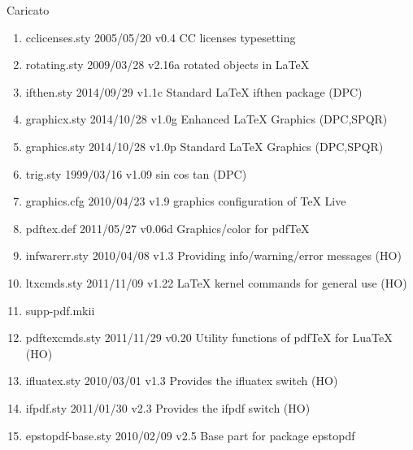 Caricato
\begin{enumerate}
\item 	cclicenses.sty    2005/05/20 v0.4 CC licenses typesetting
\item 	rotating.sty    2009/03/28 v2.16a rotated objects in LaTeX
\item  ifthen.sty    2014/09/29 v1.1c Standard LaTeX ifthen package (DPC)
	\item graphicx.sty 2014/10/28 v1.0g Enhanced LaTeX Graphics (DPC,SPQR)
	\item graphics.sty 2014/10/28 v1.0p Standard LaTeX Graphics (DPC,SPQR)
	\item trig.sty 1999/03/16 v1.09 sin cos tan (DPC)
	\item graphics.cfg 2010/04/23 v1.9 graphics configuration of TeX Live
	\item pdftex.def 2011/05/27 v0.06d Graphics/color for pdfTeX
	\item infwarerr.sty 2010/04/08 v1.3 Providing info/warning/error messages (HO)
	\item ltxcmds.sty 2011/11/09 v1.22 LaTeX kernel commands for general use (HO)
	\item supp-pdf.mkii
	\item pdftexcmds.sty 2011/11/29 v0.20 Utility functions of pdfTeX for LuaTeX (HO)
	\item ifluatex.sty 2010/03/01 v1.3 Provides the ifluatex switch (HO)
	\item ifpdf.sty 2011/01/30 v2.3 Provides the ifpdf switch (HO)
	\item epstopdf-base.sty 2010/02/09 v2.5 Base part for package epstopdf

\end{enumerate}

